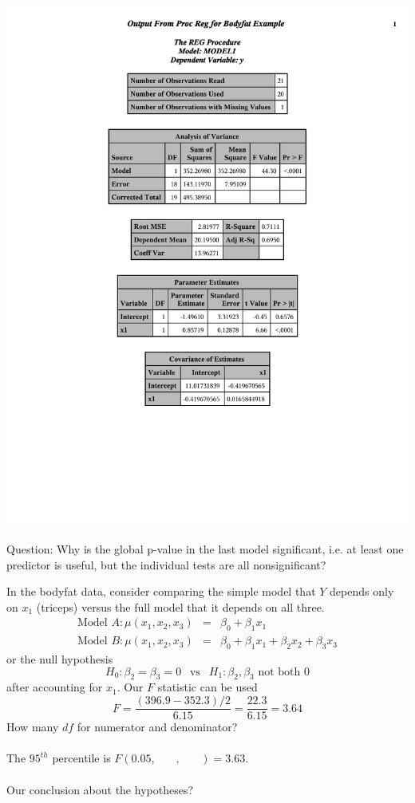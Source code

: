 \begin{center}
\begin{tabular}{cc}
\end{tabular}
\includegraphics[page=5,scale=0.6,trim=40mm 30mm 20mm 10mm]{bodyfatexample}
\end{center}

Question:  Why is the global p-value in the last model significant, i.e. at least one predictor is useful, but the individual tests are all nonsignificant?

\newpage

In the bodyfat data, consider comparing the simple model that $Y$ depends only on $x_1$ (triceps) versus the full model that it depends on all three.
\begin{eqnarray*}
\mbox{Model } A: \mu(x_1,x_2,x_3) & = & \beta_0 + \beta_1 x_1 \\
\mbox{Model } B: \mu(x_1,x_2,x_3) & = & \beta_0 + \beta_1 x_1 + \beta_2 x_2 + \beta_3 x_3 
\end{eqnarray*} 
or the null hypothesis 
$$H_0: \beta_2=\beta_3=0 \ \ \mbox{  vs  } \ \ H_1: \beta_2, \beta_3 \mbox{ not both }0$$ 
after accounting for $x_1$.
Our $F$ statistic can be used
$$ F = \frac{(396.9-352.3)/2}{6.15} = \frac{22.3}{6.15}=3.64$$
How many $df$ for numerator and denominator? \\~\\
The $95^{th}$ percentile is $F(0.05,~~~~~~~~ ,~~~~~~~~ ) = 3.63$.\\~\\
Our conclusion about the hypotheses?\\~\\~\\

